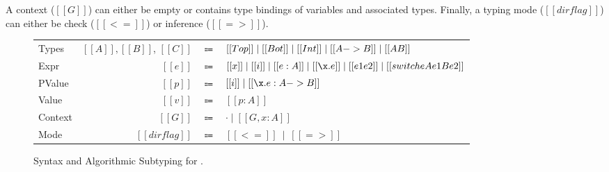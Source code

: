 A context ($[[G]]$) can
either be empty or contains type bindings of variables and associated
types. Finally, a typing mode ($[[dirflag]]$) can either be check ($[[<=]]$)
or inference ($[[=>]]$).

\begin{figure}[t]
  \begin{small}
    \centering
    \begin{tabular}{lrcl} \toprule
      Types & $[[A]], [[B]]$, $[[C]]$ & $\Coloneqq$ & $ [[Top]] \mid [[Bot]] \mid [[Int]] \mid [[A -> B]] \mid [[A \/ B]] $ \\
      Expr & $[[e]]$ & $\Coloneqq$ & $[[x]] \mid [[i]] \mid [[e:A]] \mid [[\x.e]] \mid [[e1 e2]] \mid [[switch e A e1 B e2]]$\\
      PValue & $[[p]]$ & $\Coloneqq$ & $[[i]] \mid [[\x.e : A -> B]] $\\
      Value & $[[v]]$ & $\Coloneqq$ & $[[p:A]]$\\
      Context & $[[G]]$ & $\Coloneqq$ & $ \cdot \mid [[G , x : A]]$ \\
      Mode & $[[dirflag]]$ & $\Coloneqq$ & $[[<=]] \ \mid \ [[=>]]$ \\
      \bottomrule
    \end{tabular}
  \end{small}
  \begin{small}
    \centering
  \end{small}

  \caption{Syntax and Algorithmic Subtyping for \cal.   }
  \label{fig:union:syntax}
\end{figure}
 

